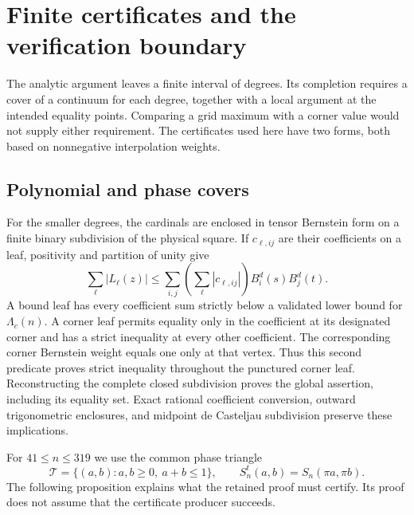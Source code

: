 \section{Finite certificates and the verification boundary}
\label{sec:certificates}

The analytic argument leaves a finite interval of degrees.  Its
completion requires a cover of a continuum for each degree, together
with a local argument at the intended equality points.  Comparing a
grid maximum with a corner value would not supply either requirement.
The certificates used here have two forms, both based on nonnegative
interpolation weights.

\subsection{Polynomial and phase covers}

For the smaller degrees, the cardinals are enclosed in tensor Bernstein
form on a finite binary subdivision of the physical square.  If
$c_{\ell,ij}$ are their coefficients on a leaf, positivity and partition
of unity give
\[
 \sum_\ell |L_\ell(z)|
 \leq\sum_{i,j}\left(\sum_\ell|c_{\ell,ij}|\right)
                 B_i^d(s)B_j^d(t).
\]
A bound leaf has every coefficient sum strictly below a validated lower
bound for $\Lambda_c(n)$.  A corner leaf permits equality only in the
coefficient at its designated corner and has a strict inequality at
every other coefficient.  The corresponding corner Bernstein weight
equals one only at that vertex.  Thus this second predicate proves
strict inequality throughout the punctured corner leaf.  Reconstructing
the complete closed subdivision proves the global assertion, including
its equality set.  Exact rational coefficient conversion, outward
trigonometric enclosures, and midpoint de Casteljau subdivision preserve
these implications.

For $41\leq n\leq319$ we use the common phase triangle
\[
 \mathcal T=\{(a,b):a,b\geq0,\ a+b\leq1\},
 \qquad S_n^t(a,b)=S_n(\pi a,\pi b).
\]
The following proposition explains what the retained proof must certify.
Its proof does not assume that the certificate producer succeeds.

